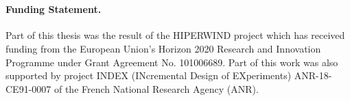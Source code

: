 {
\thispagestyle{plain}
~
\vfill
\paragraph*{Funding Statement.}
Part of this thesis was the result of the HIPERWIND project which has received funding from the European Union’s Horizon 2020 Research and Innovation Programme under Grant Agreement No. 101006689. 
Part of this work was also supported by project INDEX (INcremental Design of EXperiments) ANR-18-CE91-0007 of the French National Research Agency (ANR).
}